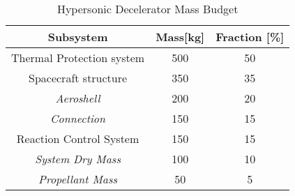 \begin{table}[H]
	\centering
	\caption{Hypersonic Decelerator Mass Budget}
	\begin{tabular}{|c|c|c|}
    \hline
    Subsystem        					& Mass[kg] 	& Fraction [\%] \\ \hline \hline
    Thermal Protection system	& 500				& 50 						\\ \hline 
		Spacecraft structure			& 350				& 35						\\ \hline
		\textit{Aeroshell}				& 200				& 20 						\\ \hline
		\textit{Connection}				& 150				& 15						\\ \hline
		Reaction Control System		& 150				& 15						\\ \hline
		\textit{System Dry Mass}	& 100				& 10						\\ \hline
		\textit{Propellant Mass}	& 50				& 5							\\ \hline
		
    \end{tabular}
    \label{tab:MassBudget}
\end{table}




